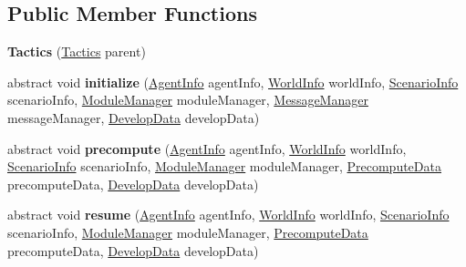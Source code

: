 \subsection*{Public Member Functions}
\begin{DoxyCompactItemize}
\item 
\hypertarget{classadf_1_1component_1_1tactics_1_1Tactics_ad864f728a03d54625cb0ce2847275993}{}\label{classadf_1_1component_1_1tactics_1_1Tactics_ad864f728a03d54625cb0ce2847275993} 
{\bfseries Tactics} (\hyperlink{classadf_1_1component_1_1tactics_1_1Tactics}{Tactics} parent)
\item 
\hypertarget{classadf_1_1component_1_1tactics_1_1Tactics_aa236f190e357a9a70a9f05605c519a44}{}\label{classadf_1_1component_1_1tactics_1_1Tactics_aa236f190e357a9a70a9f05605c519a44} 
abstract void {\bfseries initialize} (\hyperlink{classadf_1_1agent_1_1info_1_1AgentInfo}{Agent\+Info} agent\+Info, \hyperlink{classadf_1_1agent_1_1info_1_1WorldInfo}{World\+Info} world\+Info, \hyperlink{classadf_1_1agent_1_1info_1_1ScenarioInfo}{Scenario\+Info} scenario\+Info, \hyperlink{classadf_1_1agent_1_1module_1_1ModuleManager}{Module\+Manager} module\+Manager, \hyperlink{classadf_1_1agent_1_1communication_1_1MessageManager}{Message\+Manager} message\+Manager, \hyperlink{classadf_1_1agent_1_1develop_1_1DevelopData}{Develop\+Data} develop\+Data)
\item 
\hypertarget{classadf_1_1component_1_1tactics_1_1Tactics_a33456cbfd2e89a26b7e3ca4b0d19f2f4}{}\label{classadf_1_1component_1_1tactics_1_1Tactics_a33456cbfd2e89a26b7e3ca4b0d19f2f4} 
abstract void {\bfseries precompute} (\hyperlink{classadf_1_1agent_1_1info_1_1AgentInfo}{Agent\+Info} agent\+Info, \hyperlink{classadf_1_1agent_1_1info_1_1WorldInfo}{World\+Info} world\+Info, \hyperlink{classadf_1_1agent_1_1info_1_1ScenarioInfo}{Scenario\+Info} scenario\+Info, \hyperlink{classadf_1_1agent_1_1module_1_1ModuleManager}{Module\+Manager} module\+Manager, \hyperlink{classadf_1_1agent_1_1precompute_1_1PrecomputeData}{Precompute\+Data} precompute\+Data, \hyperlink{classadf_1_1agent_1_1develop_1_1DevelopData}{Develop\+Data} develop\+Data)
\item 
\hypertarget{classadf_1_1component_1_1tactics_1_1Tactics_a751ccc020f8d67df919cc5c9cd6fa298}{}\label{classadf_1_1component_1_1tactics_1_1Tactics_a751ccc020f8d67df919cc5c9cd6fa298} 
abstract void {\bfseries resume} (\hyperlink{classadf_1_1agent_1_1info_1_1AgentInfo}{Agent\+Info} agent\+Info, \hyperlink{classadf_1_1agent_1_1info_1_1WorldInfo}{World\+Info} world\+Info, \hyperlink{classadf_1_1agent_1_1info_1_1ScenarioInfo}{Scenario\+Info} scenario\+Info, \hyperlink{classadf_1_1agent_1_1module_1_1ModuleManager}{Module\+Manager} module\+Manager, \hyperlink{classadf_1_1agent_1_1precompute_1_1PrecomputeData}{Precompute\+Data} precompute\+Data, \hyperlink{classadf_1_1agent_1_1develop_1_1DevelopData}{Develop\+Data} develop\+Data)

\end{DoxyCompactItemize}
